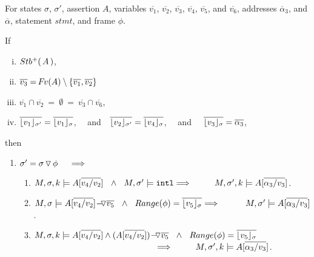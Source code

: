 \begin{lemma}
\label{l:calls}
For states $\sigma$, $\sigma'$, assertion $A$, %
variables  $\overline{v_1}$,    $\overline{v_2}$,  $\overline{v_3}$,   $\overline{v_4}$,    $\overline{v_5}$,  and  $\overline{v_6}$,
addresses $\overline \alpha_3$, and $\overline \alpha$, statement $stmt$, and frame $\phi$.

\noindent
If 
\begin{enumerate}[(i)]
\item 
\label{l:calls:r:one}
$ \Pos A$,  
\item 
\label{l:calls:r:two}
$\overline {v_3} =\fv(A) \setminus \{  \overline{v_1} , \overline{v_2} \}$ %
\item 
\label{l:calls:r:three}
 $\overline{v_1} \cap \overline{v_2}\  =\ \emptyset\ = \ \overline{v_3} \cap \overline{v_6}$,
\item 
\label{l:calls:r:four}
 $\overline {\interpret {\sigma'} {v_1} } = \overline {\interpret {\sigma} {v_1} }$, \ \ and\ \  $\overline {\interpret {\sigma'}  {v_2} } = \overline {\interpret {\sigma} {v_4} }$, \ \ and \ \  $\overline {\interpret {\sigma}  {v_3} } = \overline {\alpha_3}$,   
\end{enumerate}
 then 
\begin{enumerate}

\item
\label{l:calls:callee}
$\sigma'=\sigma  \pushSymbol \phi  \ \ \ \   \Longrightarrow$

\begin{enumerate}
\item
\label{l:calls:callee:one}
$\satDAssertFrom M  \sigma k   A[\overline {v_4/v_2}] \ \    \wedge\ \ M, \sigma' \models \intThis  
 \hfill  \Longrightarrow\ \ \ \ \ \ \  \ \satDAssertFrom M  {\sigma'} k   A[\overline { \alpha_3/v_3}]$.

\item
\label{l:calls:callee:two}
$%
M, \sigma \models {\PushAS  {v_5} { A[\overline {v_4/v_2}] }}  \ \ \wedge\ \ Range(\phi)=\overline {\interpret {\sigma} {v_5}}
\hfill \Longrightarrow  \ \ \ \  \   \ \ \ \ %
M, \sigma' \models  {A[\overline  {\alpha_3/v_3}]}$.

\item
\label{l:calls:callee:three}
$\satDAssertFrom M  \sigma k   {A[\overline {v_4/v_2}]  \wedge (\PushAS  {v_5} { A[\overline {v_4/v_2}] )}}  \ \ \wedge\ \ Range(\phi)=\overline {\interpret {\sigma} {v_5}}
  $\\  $
\strut \hspace{5cm} \hfill \Longrightarrow \ \ \ \ \ \ \  \   \satDAssertFrom M  {\sigma'} k  {A[\overline { \alpha_3/v_3}]}$.



\end{enumerate}
\end{enumerate}
\end{lemma}
